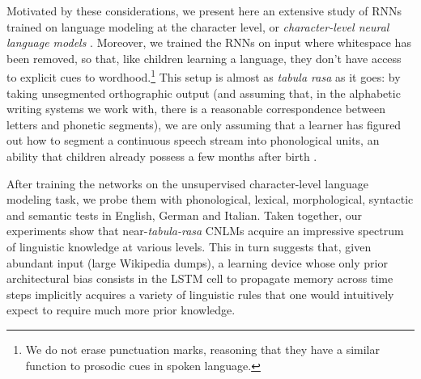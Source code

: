 Motivated by these considerations, we present here an extensive study
of RNNs trained on language modeling at the character level, or
\emph{character-level neural language models}
\cite[CNLMs,][]{Mikolov:etal:2011,Sutskever:etal:2011,Graves:2014}. Moreover,
we trained the RNNs on input where whitespace has been removed, so
that, like children learning a language, they don't have access to
explicit cues to wordhood.\footnote{We do not erase punctuation marks,
  reasoning that they have a similar function to prosodic cues in
  spoken language.} This setup is almost as \emph{tabula rasa} as it
goes: by taking unsegmented orthographic output (and assuming that, in
the alphabetic writing systems we work with, there is a reasonable
correspondence between letters and phonetic segments), we are only
assuming that a learner has figured out how to segment a continuous
speech stream into phonological units, an ability that children
already possess a few months after birth
\cite[e.g.,][]{Maye:etal:2002,Kuhl:2004}.

After training the networks on the unsupervised character-level
language modeling task, we probe them with phonological, lexical,
morphological, syntactic and semantic tests in English, German and
Italian. Taken together, our experiments show that
near-\emph{tabula-rasa} CNLMs acquire an impressive spectrum of
linguistic knowledge at various levels.  This in turn suggests that,
given abundant input (large Wikipedia dumps), a learning device whose
only prior architectural bias consists in the LSTM cell to propagate
memory across time steps implicitly acquires a variety of linguistic
rules that one would intuitively expect to require much more prior
knowledge.
